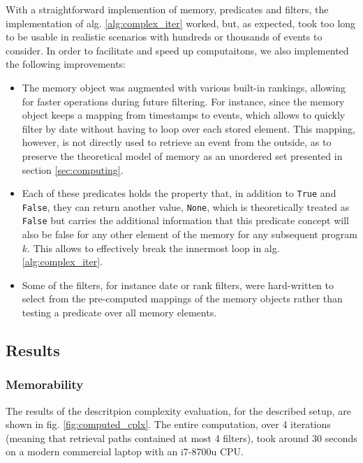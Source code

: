 \documentclass[conference]{IEEEtran}
\begin{document}
With a straightforward implemention of memory, predicates and filters, the
implementation of alg. \ref{alg:complex_iter} worked, but, as expected, took too
long to be usable in realistic scenarios with hundreds or thousands of events to
consider. In order to facilitate and speed up computaitons, we also implemented
the following improvements:
\begin{itemize}
  \item The memory object was augmented with various built-in rankings, allowing
  for faster operations during future filtering. For instance, since the memory
  object keeps a mapping from timestamps to events, which allows to quickly
  filter by date without having to loop over each stored element. This mapping,
  however, is not directly used to retrieve an event from the outside, as to
  preserve the theoretical model of memory as an unordered set presented in
  section \ref{sec:computing}.

  \item Each of these predicates holds the property that, in addition to
  \texttt{True} and \texttt{False}, they can return another value,
  \texttt{None}, which is theoretically treated as \texttt{False} but carries
  the additional information that this predicate concept will also be false for
  any other element of the memory for any subsequent program $k$. This allows to
  effectively break the innermost loop in alg. \ref{alg:complex_iter}.

  \item Some of the filters, for instance date or rank filters, were
  hard-written to select from the pre-computed mappings of the memory objects
  rather than testing a predicate over all memory elements.
\end{itemize}


\subsection{Results}

\subsubsection{Memorability}

The results of the descritpion complexity evaluation, for the described setup,
are shown in fig. \ref{fig:computed_cplx}. The entire computation, over 4
iterations (meaning that retrieval paths contained at most 4 filters), took
around 30 seconds on a modern commercial laptop with an i7-8700u CPU.
\end{document}
